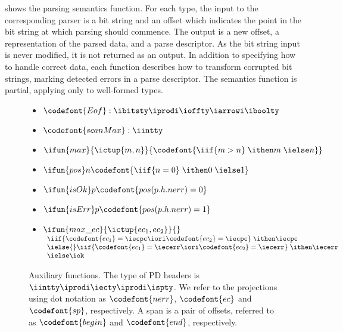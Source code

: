 shows the parsing semantics function.  For each
type, the input to the corresponding parser is a bit string and an
offset which indicates the point in the bit string at which parsing
should commence.  The output is a new offset, a representation of the
parsed data, and a parse descriptor. As the bit string input is
never modified, it is not returned as an output.  In addition
to specifying how to handle correct data, each function describes how
to transform corrupted bit strings, marking detected errors in
a parse descriptor. The semantics function is partial, applying only
to well-formed \ddc{} types.

\begin{figure}
\begin{itemize}
\item[] $\codefont {Eof} : \ibitsty \iprodi \ioffty \iarrowi \iboolty$

\item[] $\codefont{scanMax} : \iintty$

\item[] $\ifun {max} {\ictup{m,n}} {\codefont{\iif {m>n}\; \ithen m\; \ielse n}}$
\item[] $\ifun {pos} n {\codefont{\iif {n=0}\; \ithen 0\; \ielse 1}}$
\item[] $\ifun {isOk} p {\codefont{pos(p.h.nerr) = 0}}$
\item[] $\ifun {isErr} p {\codefont{pos(p.h.nerr) = 1}}$

\item[] $\ifun {max\_ec} {\ictup{ec_1, ec_2}} {}$ \\
  $\begin{array}{l}
    \iif {\codefont{ec_1} = \iecpc \iori \codefont{ec_2} = \iecpc}\; \ithen \iecpc \\
    \ielse{} \iif {\codefont{ec_1} = \iecerr \iori \codefont{ec_2} = \iecerr}\; \ithen \iecerr \\
    \ielse \iok
   \end{array}$
\end{itemize}
\caption{Auxiliary functions.  The type of PD headers is $\iintty
  \iprodi \iecty \iprodi \ispty$.  We refer to the projections using
  dot notation as $\codefont{nerr}$, $\codefont{ec}$ and
  $\codefont{sp}$, respectively. A span is a pair of offsets, referred
  to as $\codefont{begin}$ and $\codefont{end}$, respectively.}
\label{fig:aux-funs}
\end{figure}

